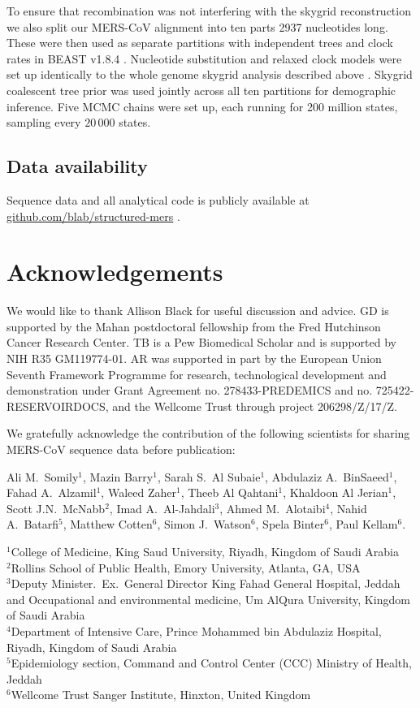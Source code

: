 \documentclass[9pt,lineno]{elife}
\begin{document}
To ensure that recombination was not interfering with the skygrid reconstruction we also split our MERS-CoV alignment into ten parts 2937 nucleotides long.
These were then used as separate partitions with independent trees and clock rates in BEAST v1.8.4 \citep{drummond_bayesian_2012}.
Nucleotide substitution and relaxed clock models were set up identically to the whole genome skygrid analysis described above \citep{drummond_2006,hky_1985,yang_1994}.
Skygrid coalescent tree prior \citep{gill_2013} was used jointly across all ten partitions for demographic inference.
Five MCMC chains were set up, each running for 200 million states, sampling every $20\,000$ states.


\subsection*{Data availability}
Sequence data and all analytical code is publicly available at \href{https://github.com/blab/structured-mers}{github.com/blab/structured-mers} \citep{mers-structure}.

\section*{Acknowledgements}
We would like to thank Allison Black for useful discussion and advice.
GD is supported by the Mahan postdoctoral fellowship from the Fred Hutchinson Cancer Research Center.
TB is a Pew Biomedical Scholar and is supported by NIH R35 GM119774-01.
AR was supported in part by the European Union Seventh Framework Programme for research, technological development and demonstration under Grant Agreement no. 278433-PREDEMICS and no. 725422-RESERVOIRDOCS, and the Wellcome Trust through project 206298/Z/17/Z.

We gratefully acknowledge the contribution of the following scientists for sharing MERS-CoV sequence data before publication:

Ali M.\ Somily$^{1}$, Mazin Barry$^{1}$, Sarah S.\ Al Subaie$^{1}$, Abdulaziz A.\ BinSaeed$^{1}$, Fahad A.\ Alzamil$^{1}$, Waleed Zaher$^{1}$, Theeb Al Qahtani$^{1}$, Khaldoon Al Jerian$^{1}$, Scott J.N.\ McNabb$^{2}$, Imad A.\ Al-Jahdali$^{3}$, Ahmed M.\ Alotaibi$^{4}$, Nahid A.\ Batarfi$^{5}$, Matthew Cotten$^{6}$, Simon J.\ Watson$^{6}$, Spela Binter$^{6}$, Paul Kellam$^{6}$.


$^{1}$College of Medicine, King Saud University, Riyadh, Kingdom of Saudi Arabia \\
$^{2}$Rollins School of Public Health, Emory University, Atlanta, GA, USA \\
$^{3}$Deputy Minister.\ Ex.\ General Director King Fahad General Hospital, Jeddah and Occupational and environmental medicine, Um AlQura University, Kingdom of Saudi Arabia \\
$^{4}$Department of Intensive Care, Prince Mohammed bin Abdulaziz Hospital, Riyadh, Kingdom of Saudi Arabia \\
$^{5}$Epidemiology section, Command and Control Center (CCC) Ministry of Health, Jeddah \\
$^{6}$Wellcome Trust Sanger Institute, Hinxton, United Kingdom \\
\end{document}
